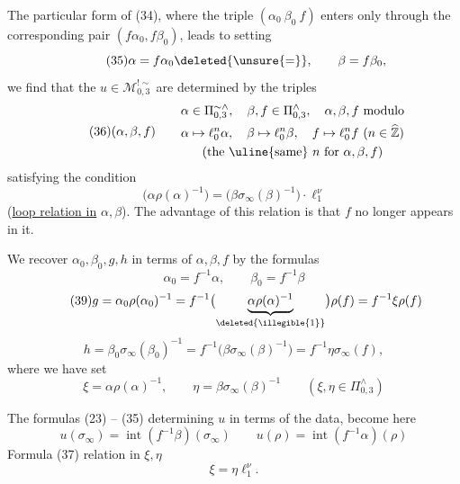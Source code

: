 The particular form of (34), where the triple $(\alpha_0\ \beta_0\ f)$ enters only through the corresponding pair $(f\alpha_0,f\beta_0)$, leads to setting
\[
\tag{35}
\alpha=f\alpha_0\deleted{\unsure{=}},\qquad\beta=f\beta_0,
\]
we find that the $u\in\mathcal{M}_{0,3}^{!\sim}$ are determined by the triples
\[
\tag{36}
(\alpha,\beta,f)\qquad
\begin{gathered}
\alpha\in\Pi_{0,3}^{\sim\wedge},\quad\beta,f\in\Pi_{0,3}^{\wedge},\quad
\alpha,\beta,f\ \text{modulo}\\
\alpha\mapsto\ell_0^n\alpha,\quad\beta\mapsto\ell_0^n\beta,\quad
f\mapsto\ell_0^n f\ (n\in\widehat{\mathbb Z})\\
\text{(the \uline{same} }n\text{ for }\alpha,\beta,f\text{)}
\end{gathered}
\]
satisfying the condition
\[
\tag{37}
\boxed{\bigl(\alpha\rho(\alpha)^{-1}\bigr)
=\bigl(\beta\sigma_\infty(\beta)^{-1}\bigr)\cdot\ell_1^\nu}
\]
(\uline{loop relation in} $\alpha,\beta$). The advantage of this relation is that $f$ no longer appears in it.

We recover $\alpha_0,\beta_0,g,h$ in terms of $\alpha,\beta,f$ by the formulas
\[
\tag{38}
\alpha_0=f^{-1}\alpha,\qquad\beta_0=f^{-1}\beta
\]
\[
\tag{39}
g=\alpha_0\rho(\alpha_0)^{-1}
=f^{-1}\bigl(\underbrace{\alpha\rho(\alpha)^{-1}}_{\deleted{\illegible{1}}}\bigr)\rho(f)
=f^{-1}\xi\rho(f)
\]
\[
\tag{40}
h=\beta_0\sigma_\infty(\beta_0)^{-1}
=f^{-1}\bigl(\beta\sigma_\infty(\beta)^{-1}\bigr)
=f^{-1}\eta\sigma_\infty(f),
\]
where we have set
\[
\tag{41}
\xi=\alpha\rho(\alpha)^{-1},\qquad
\eta=\beta\sigma_\infty(\beta)^{-1}
\qquad(\xi,\eta\in\Pi_{0,3}^{\wedge})
\]


The formulas (23) -- (35) determining $u$ in terms of the  data, become here
\[
\tag{42}
u(\sigma_\infty)=\operatorname{int}(f^{-1}\beta)(\sigma_\infty)
\qquad u(\rho)=\operatorname{int}(f^{-1}\alpha)(\rho)
\]
Formula (37)  relation in $\xi,\eta$
\[
\tag{43}
\xi=\eta\ell_1^\nu.
\]


